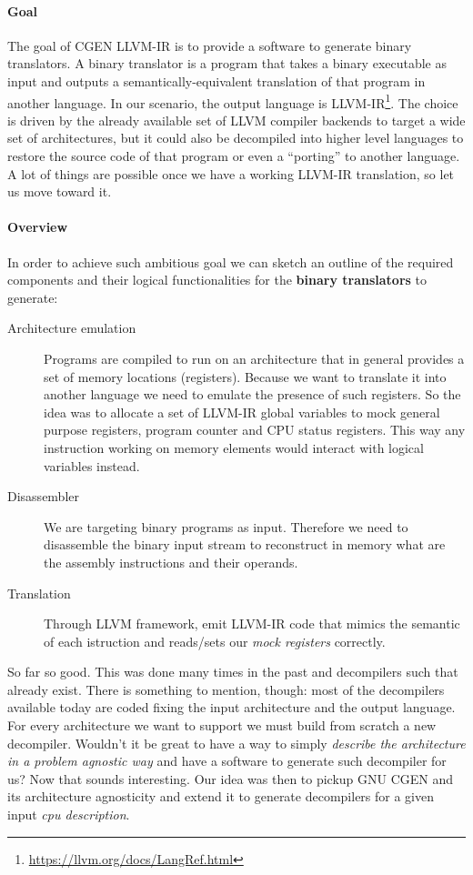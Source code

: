 \documentclass{article}
\begin{document}
\paragraph{Goal}
The goal of CGEN LLVM-IR is to provide a software to generate binary translators. A binary translator is a program that takes a binary executable as input and outputs a semantically-equivalent translation of that program in another language. In our scenario, the output language is LLVM-IR\footnote{\url{https://llvm.org/docs/LangRef.html}}. The choice is driven by the already available set of LLVM compiler backends to target a wide set of architectures, but it could also be decompiled into higher level languages to restore the source code of that program or even a ``porting'' to another language. A lot of things are possible once we have a working LLVM-IR translation, so let us move toward it.

\paragraph{Overview}
In order to achieve such ambitious goal we can sketch an outline of the required components and their logical functionalities for the \textbf{binary translators} to generate:
\begin{description}
\item[Architecture emulation] Programs are compiled to run on an architecture that in general provides a set of memory locations (registers). Because we want to translate it into another language we need to emulate the presence of such registers. So the idea was to allocate a set of LLVM-IR global variables to mock general purpose registers, program counter and CPU status registers. This way any instruction working on memory elements would interact with logical variables instead.
\item[Disassembler] We are targeting binary programs as input. Therefore we need to disassemble the binary input stream to reconstruct in memory what are the assembly instructions and their operands.
\item[Translation] Through LLVM framework, emit LLVM-IR code that mimics the semantic of each istruction and reads/sets our \emph{mock registers} correctly.
\end{description}

So far so good. This was done many times in the past and decompilers such that already exist. There is something to mention, though: most of the decompilers available today are coded fixing the input architecture and the output language. For every architecture we want to support we must build from scratch a new decompiler. Wouldn't it be great to have a way to simply \emph{describe the architecture in a problem agnostic way} and have a software to generate such decompiler for us? Now that sounds interesting. Our idea was then to pickup GNU CGEN and its architecture agnosticity and extend it to generate decompilers for a given input \emph{cpu description}.
\end{document}
